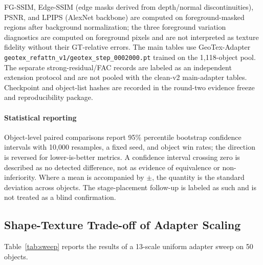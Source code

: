 \documentclass[times,twocolumn,final]{elsarticle}
\begin{document}
FG-SSIM, Edge-SSIM (edge masks derived from depth/normal discontinuities), PSNR, and LPIPS (AlexNet backbone) are computed on foreground-masked regions after background normalization; the three foreground variation diagnostics are computed on foreground pixels and are not interpreted as texture fidelity without their GT-relative errors. The main tables use GeoTex-Adapter \texttt{geotex\_refattn\_v1/geotex\_step\_0002000.pt} trained on the 1{,}118-object pool. The separate strong-residual/FAC records are labeled as an independent extension protocol and are not pooled with the clean-v2 main-adapter tables. Checkpoint and object-list hashes are recorded in the round-two evidence freeze and reproducibility package.

\paragraph{Statistical reporting}
Object-level paired comparisons report 95\% percentile bootstrap confidence intervals with 10{,}000 resamples, a fixed seed, and object win rates; the direction is reversed for lower-is-better metrics. A confidence interval crossing zero is described as no detected difference, not as evidence of equivalence or non-inferiority. Where a mean is accompanied by $\pm$, the quantity is the standard deviation across objects. The stage-placement follow-up is labeled as such and is not treated as a blind confirmation.

\iffalse
\subsection{Shape-Texture Trade-off of Adapter Scaling}
\label{subsec:tradeoff}

Table~\ref{tab:sweep} reports the results of a 13-scale uniform adapter sweep on 50 objects.
\end{document}
